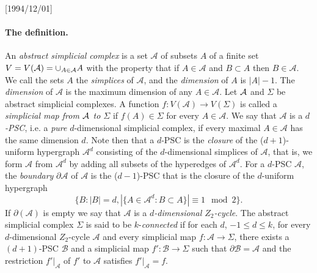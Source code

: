 \NeedsTeXFormat{LaTeX2e}[1994/12/01]\documentclass[letterpaper, 11pt]{article}
\theoremstyle{definition}
\theoremstyle{remark}
\numberwithin{equation}{section}
\newcommand{\cA}{\mathcal{A}}
\newcommand{\cB}{\mathcal{B}}
\begin{document}
\paragraph{The definition.}
An {\em abstract
  simplicial complex} is a set $\cA$ of subsets $A$ of a finite set
$V=V(\cA) = \cup_{A\in {\cal A}} A$ with the property that if $A\in\cA$ 
and $B\subset A$ then $B\in\cA$. We call the sets $A$ the {\it
  simplices} of $\cA$, and the {\it dimension} of $A$ is $|A|-1$.
The {\it dimension} of $\cA$ is the maximum dimension of any
$A\in\cA$. 
Let ${\cal A}$ and $\Sigma$ be abstract simplicial complexes. 
A function $f:V(\cA) \rightarrow V(\Sigma)$ is called a {\em simplicial map
from ${\cal A}$ to $\Sigma$} if $f(A) \in \Sigma$ for every $A\in \cA$.
We say that $\cA$ is a {\em $d$-PSC}, i.e. a {\it pure}
$d$-dimensional simplicial complex, if every maximal $A\in\cA$ has the same
dimension $d$. 
Note then that a $d$-PSC is the {\it closure} of the ($d+1$)-uniform
hypergraph $\cA^d$ consisting of the $d$-dimensional simplices of
$\cA$, that is, 
we form $\cA$ from $\cA^d$ by adding all subsets of the hyperedges of
$\cA^d$.
For a $d$-PSC $\cA$, the {\it boundary}  $\partial\cA$  of $\cA$ is
the ($d-1$)-PSC that is the closure of the $d$-uniform hypergraph
$$\{B:|B|=d, |\{A\in\cA^d:B\subset A\}|\equiv 1\mod 2\}.$$
If $\partial(\cA)$ is empty we say that $\cA$ is a {\em $d$-dimensional $Z_2$-cycle}.
The abstract simplicial complex $\Sigma$ is said to be $k$-{\it connected} if
for each $d$, $-1\leq d\leq k$, for every $d$-dimensional $Z_2$-cycle
$\cA$ and every
simplicial map $f:\cA\to\Sigma$, there exists a $(d+1)$-PSC $\cB$ and
a simplicial map  $f':\cB\to\Sigma$ such that $\partial\cB=\cA$
and the restriction $f'|_{\cA}$ of $f'$ to $\cA$ satisfies 
$f'|_{\cA}=f$. 
\end{document}
